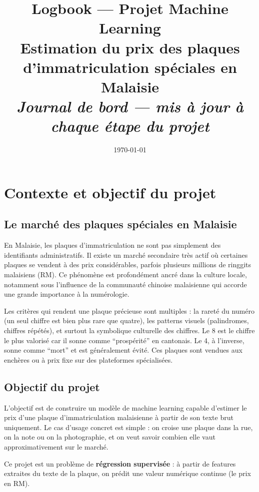 \documentclass[12pt, a4paper]{article}
\title{
  \vspace{-1cm}
  {\Large \textbf{Logbook — Projet Machine Learning}} \\[0.5cm]
  {\large Estimation du prix des plaques d'immatriculation spéciales en Malaisie} \\[0.3cm]
  {\normalsize \textit{Journal de bord — mis à jour à chaque étape du projet}}
}
\author{}
\date{\today}
\begin{document}
\maketitle
\tableofcontents
\newpage

\section{Contexte et objectif du projet}

\subsection{Le marché des plaques spéciales en Malaisie}

En Malaisie, les plaques d'immatriculation ne sont pas simplement des identifiants administratifs. Il existe un marché secondaire très actif où certaines plaques se vendent à des prix considérables, parfois plusieurs millions de ringgits malaisiens (RM). Ce phénomène est profondément ancré dans la culture locale, notamment sous l'influence de la communauté chinoise malaisienne qui accorde une grande importance à la numérologie.

Les critères qui rendent une plaque précieuse sont multiples : la rareté du numéro (un seul chiffre est bien plus rare que quatre), les patterns visuels (palindromes, chiffres répétés), et surtout la symbolique culturelle des chiffres. Le 8 est le chiffre le plus valorisé car il sonne comme ``prospérité'' en cantonais. Le 4, à l'inverse, sonne comme ``mort'' et est généralement évité. Ces plaques sont vendues aux enchères ou à prix fixe sur des plateformes spécialisées.

\subsection{Objectif du projet}

L'objectif est de construire un modèle de machine learning capable d'estimer le prix d'une plaque d'immatriculation malaisienne à partir de son texte brut uniquement. Le cas d'usage concret est simple : on croise une plaque dans la rue, on la note ou on la photographie, et on veut savoir combien elle vaut approximativement sur le marché.

Ce projet est un problème de \textbf{régression supervisée} : à partir de features extraites du texte de la plaque, on prédit une valeur numérique continue (le prix en RM).
\end{document}
